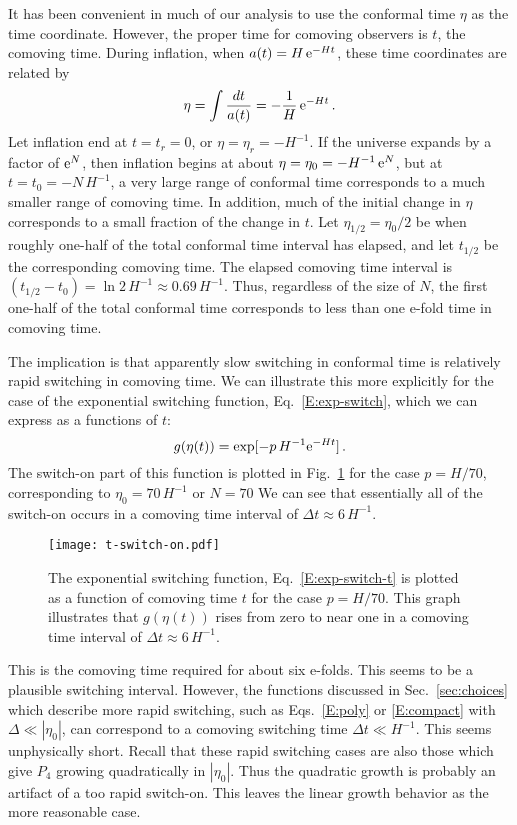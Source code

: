 \documentclass[preprint,prd,showpacs,superscriptaddress]{revtex4}
\begin{document}
  
  It has been convenient in much of our analysis to use the conformal time $\eta$ as the time coordinate. However, the proper 
  time for comoving observers is $t$, the comoving time. During inflation, when $a(t) = H\, {\rm e}^{- H t}$, these time coordinates 
  are related by
 \begin{equation}
\eta = \int \frac{dt}{a(t)} = -  \frac{1}{H}\, {\rm e}^{- H t} \,.
\end{equation}
Let inflation end at $t=t_r=0$, or $\eta =\eta_r = - H^{-1}$. If the universe expands by a factor of ${\rm e}^{N}$, then inflation
begins at about $\eta =\eta_0 = -H^{-1}\, {\rm e}^{N}$, but at $t= t_0 = -N\, H^{-1}$, a very large range of conformal time
corresponds to a much smaller range of comoving time. In addition, much of the initial change in $\eta$ corresponds to a small
fraction of the change in $t$. Let $\eta_{1/2} = \eta_0/2$ be when roughly one-half of the total conformal time interval
has elapsed, and let $t_{1/2}$ be the corresponding comoving time. The elapsed comoving time interval is 
$(t_{1/2}-t_0) = \ln 2 \,H^{-1} \approx 0.69  \,H^{-1}$. Thus, regardless of the size of $N$, the first one-half of the total conformal 
time corresponds to less than one e-fold time in comoving time.

The implication is that apparently slow switching in conformal time is relatively rapid switching in comoving time.
We can illustrate this more explicitly for the case of the exponential switching function, Eq.~\eqref{E:exp-switch}, which we 
can express as a functions of $t$:
\begin{equation}
g(\eta(t)) = \exp[-p\, H^{-1}  {\rm e}^{- H t} ]\,.
\label{E:exp-switch-t}
\end{equation} 
The switch-on part of this function is plotted in Fig.~\ref{fig:t-switch} for the case $p= H/70$, corresponding to
$\eta_0 = 70 \, H^{-1}$ or $N=70$ We can see that essentially all of the switch-on occurs in a comoving time interval
of $\Delta t \approx 6\, H^{-1}$.
\begin{figure}[htbp]
	\centering
		\texttt{[image: t-switch-on.pdf]}
		\caption{The exponential switching function, Eq.~\eqref{E:exp-switch-t} is plotted as a function of comoving time
		$t$ for the case  $p= H/70$. This graph illustrates that $g(\eta(t))$ rises from zero to near one in a comoving time 
		interval of  $\Delta t \approx 6\, H^{-1}$.  }
	\label{fig:t-switch}
\end{figure}

This is the comoving time required for about six e-folds. This seems to be a plausible switching interval. However, the
functions discussed in Sec.~\ref{sec:choices} which describe more rapid switching, such as Eqs.~\eqref{E:poly} 
or \eqref{E:compact} with $\Delta \ll |\eta_0|$, can correspond to a comoving switching time $\Delta t \ll H^{-1}$.
This seems unphysically short. Recall that these rapid switching cases are also those which give $P_4$ growing 
quadratically in $|\eta_0|$. Thus the quadratic growth is probably an artifact of a too rapid switch-on. This leaves
the linear growth behavior as the more reasonable case.
\end{document}

